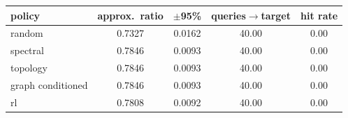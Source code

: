 \begin{tabular}{lcccc}
\toprule
policy & approx.\ ratio & $\pm$95\% & queries$\to$target & hit rate \\
\midrule
random & 0.7327 & 0.0162 & 40.00 & 0.00 \\
spectral & 0.7846 & 0.0093 & 40.00 & 0.00 \\
topology & 0.7846 & 0.0093 & 40.00 & 0.00 \\
graph conditioned & 0.7846 & 0.0093 & 40.00 & 0.00 \\
rl & 0.7808 & 0.0092 & 40.00 & 0.00 \\
\bottomrule
\end{tabular}

